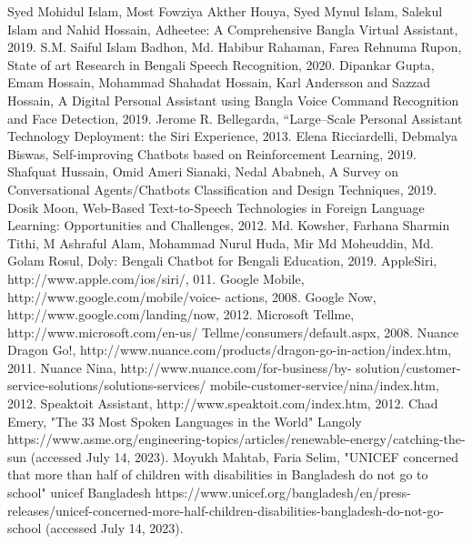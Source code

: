 
\begin{thebibliography}{00}
     Syed Mohidul Islam, Most Fowziya Akther Houya, Syed Mynul Islam, Salekul Islam and Nahid Hossain, Adheetee: A Comprehensive Bangla Virtual Assistant, 2019.
     S.M. Saiful Islam Badhon, Md. Habibur Rahaman, Farea Rehnuma Rupon, State of art Research in Bengali Speech Recognition, 2020.
     Dipankar Gupta, Emam Hossain, Mohammad Shahadat Hossain, Karl Andersson and Sazzad Hossain, A Digital Personal Assistant using Bangla Voice Command Recognition and Face Detection, 2019.
     Jerome R. Bellegarda, ``Large–Scale Personal Assistant Technology Deployment: the Siri Experience, 2013.
     Elena Ricciardelli, Debmalya Biswas, Self-improving Chatbots based on Reinforcement Learning, 2019.
     Shafquat Hussain, Omid Ameri Sianaki, Nedal Ababneh, A Survey on Conversational Agents/Chatbots Classification and Design Techniques, 2019.
     Dosik Moon, Web-Based Text-to-Speech Technologies in Foreign Language Learning: Opportunities and Challenges, 2012.
     Md. Kowsher, Farhana Sharmin Tithi, M Ashraful Alam, Mohammad Nurul Huda, Mir Md Moheuddin, Md. Golam Rosul, Doly: Bengali Chatbot for Bengali Education, 2019.
     AppleSiri, http://www.apple.com/ios/siri/, 011.
     Google Mobile, http://www.google.com/mobile/voice- actions, 2008.
     Google Now, http://www.google.com/landing/now, 2012.
     Microsoft Tellme, http://www.microsoft.com/en-us/ Tellme/consumers/default.aspx, 2008.
     Nuance Dragon Go!, http://www.nuance.com/products/dragon-go-in-action/index.htm, 2011.
     Nuance Nina, http://www.nuance.com/for-business/by- solution/customer-service-solutions/solutions-services/ mobile-customer-service/nina/index.htm, 2012.
     Speaktoit Assistant, http://www.speaktoit.com/index.htm, 2012.
     Chad Emery, "The 33 Most Spoken Languages in the World" Langoly https://www.asme.org/engineering-topics/articles/renewable-energy/catching-the-sun (accessed July 14, 2023).
     Moyukh Mahtab, Faria Selim, "UNICEF concerned that more than half of children with disabilities in Bangladesh do not go to school" unicef Bangladesh https://www.unicef.org/bangladesh/en/press-releases/unicef-concerned-more-half-children-disabilities-bangladesh-do-not-go-school (accessed July 14, 2023).

\end{thebibliography}
